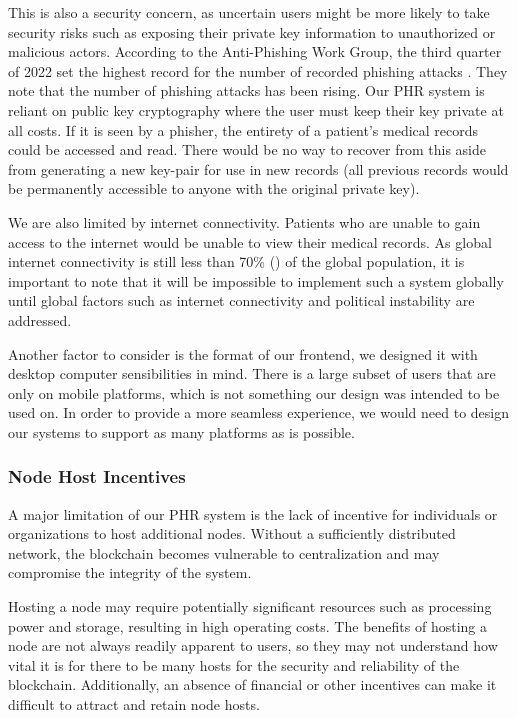 \documentclass{article}
\begin{document}
This is also a security concern, as uncertain users might be more likely to take security risks such as exposing their private key information to unauthorized or malicious actors. According to the Anti-Phishing Work Group, the third quarter of 2022 set the highest record for the number of recorded phishing attacks \cite{www.apwg.org_2022}. They note that the number of phishing attacks has been rising. Our PHR system is reliant on public key cryptography where the user must keep their key private at all costs. If it is seen by a phisher, the entirety of a patient's medical records could be accessed and read. There would be no way to recover from this aside from generating a new key-pair for use in new records (all previous records would be permanently accessible to anyone with the original private key).

We are also limited by internet connectivity. Patients who are unable to gain access to the internet would be unable to view their medical records. As global internet connectivity is still less than 70\% (\cite{itu_2022}) of the global population, it is important to note that it will be impossible to implement such a system globally until global factors such as internet connectivity and political instability are addressed. 

Another factor to consider is the format of our frontend, we designed it with desktop computer sensibilities in mind. There is a large subset of users that are only on mobile platforms, which is not something our design was intended to be used on. In order to provide a more seamless experience, we would need to design our systems to support as many platforms as is possible.

\subsubsection{Node Host Incentives}
\label{node_incentives}
A major limitation of our PHR system is the lack of incentive for individuals or organizations to host additional nodes. Without a sufficiently distributed network, the blockchain becomes vulnerable to centralization and may compromise the integrity of the system.

Hosting a node may require potentially significant resources such as processing power and storage, resulting in high operating costs. The benefits of hosting a node are not always readily apparent to users, so they may not understand how vital it is for there to be many hosts for the security and reliability of the blockchain. Additionally, an absence of financial or other incentives can make it difficult to attract and retain node hosts.
\end{document}
